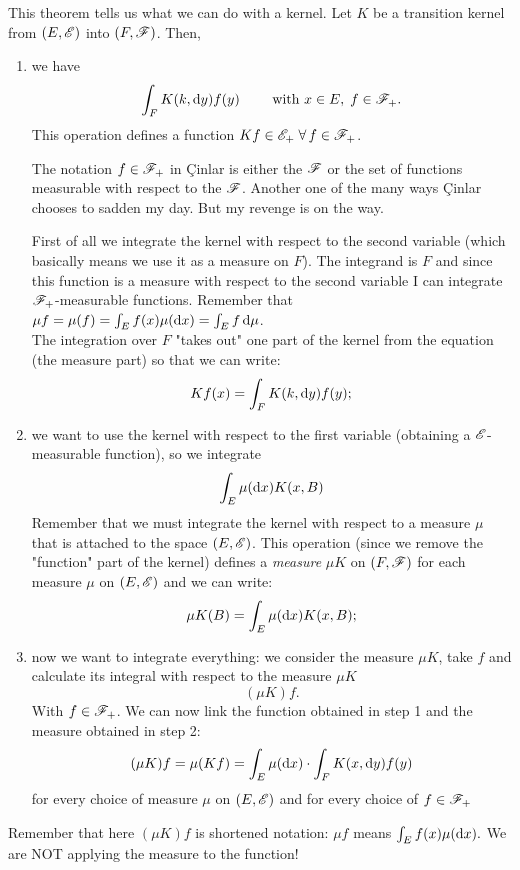 \documentclass{report}
\begin{document}
\begin{theorem}
	This theorem tells us what we can do with a kernel. Let $K$ be a transition kernel from $(E,\mathscr{E})$ into $(F,\mathscr{F})$. Then, 
	\begin{enumerate}[\circnum]
		\item we have $$\int_F K(k,\mathop{}\!\mathrm{d} y)f(y)\qquad \text{ with } x\in E,\;f\in\mathscr{F}_+.$$ This operation defines a function $Kf\in\mathscr{E}_+\;\forall\, f\in\mathscr{F}_+$.
		
			\begin{notation}
			The notation $f\in\mathscr{F}_+$ in Çinlar is either the \sa{} $\mathscr{F}$ or the set of functions measurable with respect to the \sa{} $\mathscr{F}$. Another one of the many ways Çinlar chooses to sadden my day. But my revenge is on the way.
		\end{notation}
		 First of all we integrate the kernel with respect to the second variable (which basically means we use it as a measure on $F$). The integrand is $F$ and since this function is a measure with respect to the second variable I can integrate $\mathscr{F}_+$-measurable functions. Remember that $\mu f=\mu(f)=\int_E f(x)\mu(\mathop{}\!\mathrm{d} x)=\int_Ef\mathop{}\!\mathrm{d}\mu$. \\
		The integration over $F$ "takes out" one part of the kernel from the equation (the measure part) so that we can write: \[
	Kf(x)=\int_F K(k,\mathop{}\!\mathrm{d} y)f(y);
	\]
	\item we want to use the kernel with respect to the first variable (obtaining a $\mathscr{E}$-measurable function), so we integrate 
	\[
	\int_E \mu(\mathop{}\!\mathrm{d} x)K(x,B)
	\]
	Remember that we must integrate the kernel with respect to a measure $\mu$ that is attached to the space $(E,\mathscr{E})$. This operation (since we remove the "function" part of the kernel) defines a \textit{measure} $\mu K$ on $(F,\mathscr{F})$ for each measure $\mu$ on $(E,\mathscr{E})$ and we can write:
	\[\mu K(B)=	\int_E \mu(\mathop{}\!\mathrm{d} x)K(x,B);\]
	\item now we want to integrate everything: we consider the measure $\mu K$, take $f$ and calculate its integral with respect to the measure $\mu K$
	\[(\mu K)f.\]
	With $f\in\mathscr{F}_+$. We can now link the function obtained in step 1 and the measure obtained in step 2:
	\[(\mu K)f=\mu(Kf)=\int_E\mu(\mathop{}\!\mathrm{d} x)\cdot\int_FK(x,\mathop{}\!\mathrm{d} y)f(y)\]
for every choice of measure $\mu$ on $(E,\mathscr{E})$ and for every choice of $f\in\mathscr{F}_+$
	
	
	\end{enumerate} 
\end{theorem}
	Remember that here $(\mu K)f$ is shortened notation: $\mu f$ means $\int_Ef(x)\mu(\mathop{}\!\mathrm{d} x).$ We are NOT applying the measure to the function!\\
\end{document}
